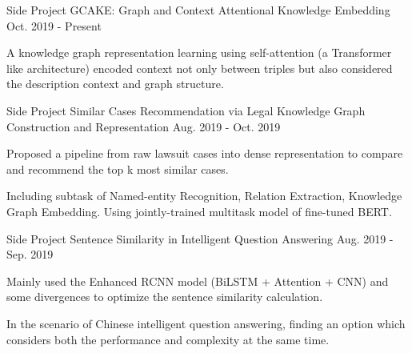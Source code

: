 

\begin{cventries}

  \cventry
    {Side Project} %
    {GCAKE: Graph and Context Attentional Knowledge Embedding} %
    {} %
    {Oct. 2019 - Present} %
    {
      \begin{cvitems} %
        \item {A knowledge graph representation learning using self-attention (a Transformer like architecture) encoded context not only between triples but also considered the description context and graph structure.}
      \end{cvitems}
    }

  \cventry
    {Side Project} %
    {Similar Cases Recommendation via Legal Knowledge Graph Construction and Representation} %
    {} %
    {Aug. 2019 - Oct. 2019} %
    {
      \begin{cvitems} %
        \item {Proposed a pipeline from raw lawsuit cases into dense representation to compare and recommend the top k most similar cases.}
        \item {Including subtask of Named-entity Recognition, Relation Extraction, Knowledge Graph Embedding. Using jointly-trained multitask model of fine-tuned BERT.}
      \end{cvitems}
    }

  \cventry
    {Side Project} %
    {Sentence Similarity in Intelligent Question Answering} %
    {} %
    {Aug. 2019 - Sep. 2019} %
    {
      \begin{cvitems} %
        \item {Mainly used the Enhanced RCNN model (BiLSTM + Attention + CNN) and some divergences to optimize the sentence similarity calculation.}
        \item {In the scenario of Chinese intelligent question answering, finding an option which considers both the performance and complexity at the same time.}
      \end{cvitems}
    }


\end{cventries}
